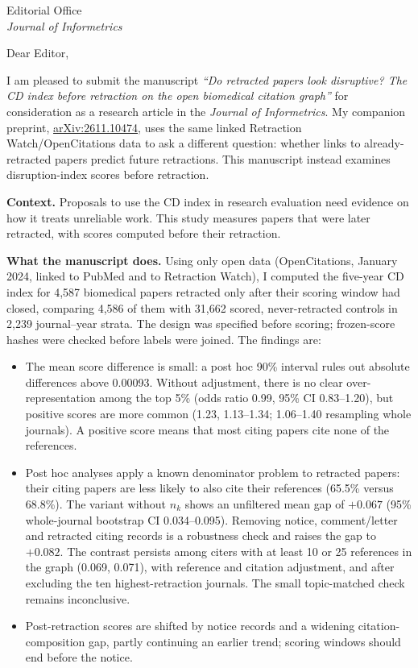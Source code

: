 \documentclass[10pt]{letter}
\date{\today}
\begin{document}
\begin{letter}{Editorial Office\\\emph{Journal of Informetrics}}
\opening{Dear Editor,}

I am pleased to submit the manuscript \emph{``Do retracted papers look disruptive? The CD index before retraction on
the open biomedical citation graph''} for consideration as a research article in the \emph{Journal of Informetrics}.
My companion preprint, \href{https://arxiv.org/abs/2611.10474}{arXiv:2611.10474}, uses the same linked
Retraction Watch/OpenCitations data to ask a different question: whether links to already-retracted papers predict
future retractions. This manuscript instead examines disruption-index scores before retraction.

\textbf{Context.} Proposals to use the CD index in research evaluation need evidence on how it treats unreliable
work. This study measures papers that were later retracted, with scores computed before their retraction.

\textbf{What the manuscript does.} Using only open data (OpenCitations, January 2024, linked to PubMed and to
Retraction Watch), I computed the five-year CD index for 4,587 biomedical papers retracted only after their scoring
window had closed, comparing 4,586 of them with 31,662 scored, never-retracted controls in 2,239 journal--year strata.
The design was specified before scoring; frozen-score hashes were checked before labels were joined. The findings are:
\begin{itemize}
\item The mean score difference is small: a post hoc 90\% interval rules out absolute differences above 0.00093.
  Without adjustment, there is no clear over-representation among the top 5\%
  (odds ratio 0.99, 95\% CI 0.83--1.20), but positive scores are more common (1.23, 1.13--1.34; 1.06--1.40
  resampling whole journals). A positive score means that most citing papers cite none of the references.
\item Post hoc analyses apply a known denominator problem to retracted papers: their citing papers are less likely
  to also cite their references (65.5\% versus 68.8\%). The variant without $n_k$ shows an unfiltered mean gap
  of $+0.067$ (95\% whole-journal bootstrap CI 0.034--0.095).
  Removing notice, comment/letter and retracted citing records is a robustness check and raises the gap to $+0.082$.
  The contrast persists among citers with at least 10 or 25 references in the graph (0.069, 0.071), with
  reference and citation adjustment, and after excluding the ten highest-retraction journals.
  The small topic-matched check remains inconclusive.
\item Post-retraction scores are shifted by notice records and a widening citation-composition gap, partly continuing
  an earlier trend; scoring windows should end before the notice.
\end{itemize}


\end{letter}
\end{document}

